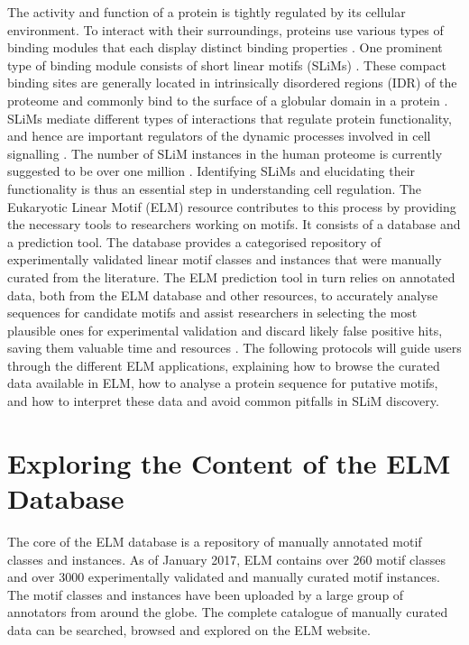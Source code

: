 \documentclass[12pt]{article}
\newcounter{proto}
\begin{document}
The activity and function of a protein is tightly regulated by its
cellular environment. To interact with their surroundings, proteins use
various types of binding modules that each display distinct binding
properties \citep{10550212}. One prominent type of binding module
consists of short linear motifs (SLiMs) \citep{18508681}. These compact
binding sites are generally located in intrinsically disordered regions
(IDR) of the proteome and commonly bind to the
surface of a globular domain in a protein \citep{21909575}. SLiMs mediate
different types of interactions that regulate protein functionality, and hence
are important regulators of the dynamic processes involved in cell
signalling \citep{22480932} \citep{24926813}. The number of
SLiM instances in the human proteome is currently suggested to be over
one million \citep{25038412}. Identifying SLiMs and elucidating their
functionality is thus an essential step in understanding cell regulation.
The Eukaryotic Linear Motif (ELM) resource contributes to this process by
providing the necessary tools to researchers working on motifs. It
consists of a database and a prediction tool. The database provides a
categorised repository of experimentally validated linear motif classes
and instances that were manually curated from the literature. The ELM
prediction tool in turn relies on annotated data, both from the ELM
database and other resources, to accurately analyse sequences
for candidate motifs and assist researchers in selecting the most
plausible ones for experimental validation and discard likely false
positive hits, saving them valuable time and resources \citep{22110040}.
The following protocols will guide users through the different ELM
applications, explaining how to browse the curated data available in
ELM, how to analyse a protein sequence for putative motifs, and how to
interpret these data and avoid common pitfalls in SLiM discovery.


\section{Exploring the Content of the ELM Database}%
\label{sec:explore_content}%

The core of the ELM database is a repository of manually annotated motif classes
and instances. As of January 2017, ELM contains over 260 motif classes and over
3000 experimentally validated and manually curated motif instances. The motif
classes and instances have been uploaded by a large group of annotators from
around the globe. The complete catalogue of manually curated data can be
searched, browsed and explored on the ELM website.
\end{document}
